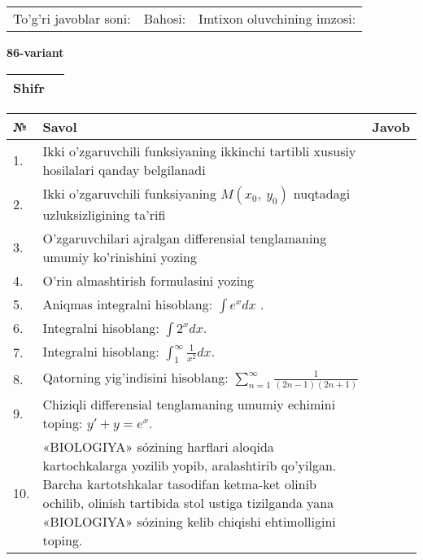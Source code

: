 \documentclass{article}
\begin{document}
  \vspace{1cm}
  
  \begin{tabular}{lll}
  To'g'ri javoblar soni: \underline{\hspace{1.5cm}} & 
  Bahosi: \underline{\hspace{1.5cm}} & 
  Imtixon oluvchining imzosi: \underline{\hspace{2cm}} \\
  \end{tabular}
  
  \egroup
  
  \newpage
  
  
  \textbf{86-variant}\\
  
  \bgroup
  \def\arraystretch{1.6} %
  
  \begin{tabular}{|m{5.7cm}|m{9.5cm}|}
  \hline
  Shifr & \\
  \hline
  \end{tabular}
  
  \vspace{1cm}
  
  \begin{tabular}{|m{0.7cm}|m{10cm}|m{4cm}|}
  \hline
  № & Savol & Javob \\
  \hline
  1. & Ikki o'zgaruvchili funksiyaning ikkinchi tartibli xususiy hosilalari qanday belgilanadi &  \\
  \hline
  2. & Ikki o'zgaruvchili funksiyaning \(M(x_{0},\ y_{0})\) nuqtadagi uzluksizligining ta'rifi &  \\
  \hline
  3. & O'zgaruvchilari ajralgan differensial tenglamaning umumiy ko'rinishini yozing &  \\
  \hline
  4. & O'rin almashtirish formulasini yozing &  \\
  \hline
  5. & Aniqmas integralni hisoblang: \(\int {e^{x}dx}\) . &  \\
  \hline
  6. & Integralni hisoblang: \(\int {2^{x}dx}\). &  \\
  \hline
  7. & Integralni hisoblang: \(\int_{1}^{\infty}{\frac{1}{x^{2}}dx}\). &  \\
  \hline
  8. & Qatorning yig'indisini hisoblang: \(\sum_{n = 1}^{\infty}\frac{1}{(2n - 1)(2n + 1)}\) &  \\
  \hline
  9. & Chiziqli differensial tenglamaning umumiy echimini toping: \(y' + y = e^{x}\). &  \\
  \hline
  10. & «BIOLOGIYA» sózining harflari aloqida kartochkalarga yozilib yopib, aralashtirib qo'yilgan. Barcha kartotshkalar tasodifan ketma-ket olinib ochilib, olinish tartibida stol ustiga tizilganda yana «BIOLOGIYA» sózining kelib chiqishi ehtimolligini toping. &  \\
  \hline
  \end{tabular}
  
\end{document}
